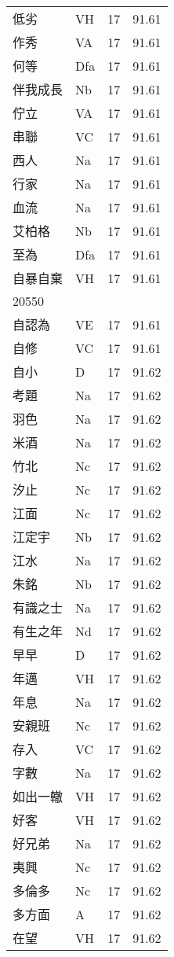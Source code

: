 \documentclass[twocolumn]{book}
\begin{document}
\begin{supertabular}{llrr}
低劣 & VH & 17 &  91.61\\
作秀 & VA & 17 &  91.61\\
何等 & Dfa & 17 &  91.61\\
伴我成長 & Nb & 17 &  91.61\\
佇立 & VA & 17 &  91.61\\
串聯 & VC & 17 &  91.61\\
西人 & Na & 17 &  91.61\\
行家 & Na & 17 &  91.61\\
血流 & Na & 17 &  91.61\\
艾柏格 & Nb & 17 &  91.61\\
至為 & Dfa & 17 &  91.61\\
自暴自棄 & VH & 17 &  91.61\\
20550\\
自認為 & VE & 17 &  91.61\\
自修 & VC & 17 &  91.61\\
自小 & D & 17 &  91.62\\
考題 & Na & 17 &  91.62\\
羽色 & Na & 17 &  91.62\\
米酒 & Na & 17 &  91.62\\
竹北 & Nc & 17 &  91.62\\
汐止 & Nc & 17 &  91.62\\
江面 & Nc & 17 &  91.62\\
江定宇 & Nb & 17 &  91.62\\
江水 & Na & 17 &  91.62\\
朱銘 & Nb & 17 &  91.62\\
有識之士 & Na & 17 &  91.62\\
有生之年 & Nd & 17 &  91.62\\
早早 & D & 17 &  91.62\\
年邁 & VH & 17 &  91.62\\
年息 & Na & 17 &  91.62\\
安親班 & Nc & 17 &  91.62\\
存入 & VC & 17 &  91.62\\
字數 & Na & 17 &  91.62\\
如出一轍 & VH & 17 &  91.62\\
好客 & VH & 17 &  91.62\\
好兄弟 & Na & 17 &  91.62\\
夷興 & Nc & 17 &  91.62\\
多倫多 & Nc & 17 &  91.62\\
多方面 & A & 17 &  91.62\\
在望 & VH & 17 &  91.62\\

\end{supertabular}
\end{document}
